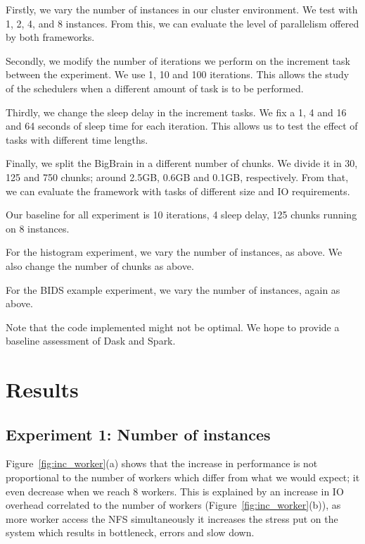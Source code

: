 \documentclass[conference]{IEEEtran}
\begin{document}
Firstly, we vary the number of instances in our cluster environment. We test with 1,
2, 4, and 8 instances. From this, we can evaluate the level of parallelism offered by
both frameworks.

Secondly, we modify the number of iterations we perform on the increment task between
the experiment. We use 1, 10 and 100 iterations. This allows the study of the
schedulers when a different amount of task is to be performed.

Thirdly, we change the sleep delay in the increment tasks. We fix a 1, 4 and 16 and
64 seconds of sleep time for each iteration. This allows us to test the effect of
tasks with different time lengths.

Finally, we split the BigBrain in a different number of chunks. We divide it in 30,
125 and 750 chunks; around 2.5GB, 0.6GB and 0.1GB, respectively. From that, we can
evaluate the framework with tasks of different size and IO requirements.

Our baseline for all experiment is 10 iterations, 4 sleep delay, 125 chunks running
on 8 instances.

For the histogram experiment, we vary the number of instances, as above. We also
change the number of chunks as above.

For the BIDS example experiment, we vary the number of instances, again as above.

Note that the code implemented might not be optimal. We hope to provide a baseline
assessment of Dask and Spark.


\section{Results}

\subsection{Experiment 1: Number of instances}
Figure~\ref{fig:inc_worker}(a) shows that the increase in performance is not
proportional to the number of workers which differ from what we would expect; it even
decrease when we reach 8 workers. This is explained by an increase in IO overhead
correlated to the number of workers (Figure~\ref{fig:inc_worker}(b)), as more worker
access the NFS simultaneously it increases the stress put on the system which results
in bottleneck, errors and slow down.
\end{document}
